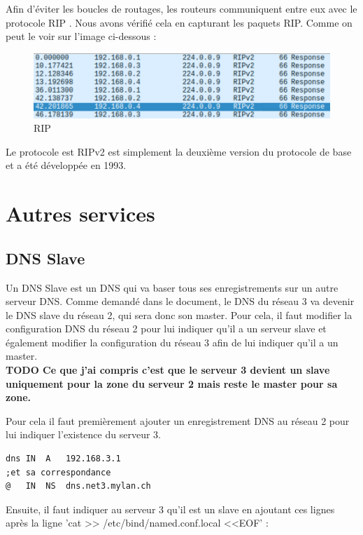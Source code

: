\documentclass{article}
\begin{document}
Afin d'éviter les boucles de routages, les routeurs communiquent entre eux avec le protocole RIP \cite{RIP}. Nous avons vérifié cela en capturant les paquets RIP. Comme on peut le voir sur l'image ci-dessous :

\begin{figure}[!h]
	\centering
	\includegraphics{./captures/rip.png}
	\caption{RIP}
	\label{fig:RIP}
\end{figure}

Le protocole est RIPv2 est simplement la deuxième version du protocole de base et a été développée en 1993\cite{RIP}.

\clearpage
\section{Autres services}

\subsection{DNS Slave\label{dns-slave}}
Un DNS Slave est un DNS qui va baser tous ses enregistrements sur un autre serveur DNS\cite{Slave}. Comme demandé dans le document, le DNS du réseau 3 va devenir le DNS slave du réseau 2, qui sera donc son master. Pour cela, il faut modifier la configuration DNS du réseau 2 pour lui indiquer qu'il a un serveur slave et également modifier la configuration du réseau 3 afin de lui indiquer qu'il a un master.\\

{\color{red}\textbf{TODO Ce que j'ai compris c'est que le serveur 3 devient un slave uniquement pour la zone du serveur 2 mais reste le master pour sa zone.}}

Pour cela il faut premièrement ajouter un enregistrement DNS au réseau 2 pour lui indiquer l'existence du serveur 3.

\begin{lstlisting}
dns	IN	A	192.168.3.1
;et sa correspondance
@	IN	NS	dns.net3.mylan.ch
\end{lstlisting}

Ensuite, il faut indiquer au serveur 3 qu'il est un slave en ajoutant ces lignes après la ligne 'cat >> /etc/bind/named.conf.local <<EOF' : 
\end{document}
